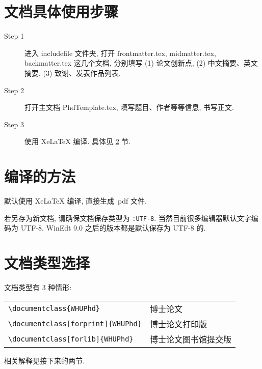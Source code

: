 \documentclass{WHUPhd}  %
\begin{document}
\section{文档具体使用步骤}

\begin{description}
  \item[Step 1]  进入 includefile 文件夹,  打开 frontmatter.tex,  midmatter.tex,  backmatter.tex 这几个文档,
        分别填写 (1) 论文创新点, (2) 中文摘要、英文摘要, (3) 致谢、发表作品列表.

  \item[Step 2]  打开主文档 PhdTemplate.tex, 填写题目、作者等等信息, 书写正文.

  \item[Step 3]  使用 XeLaTeX{} 编译. 具体见 \ref{sec-compile} 节.

\end{description}


\section{编译的方法}\label{sec-compile}

默认使用 XeLaTeX 编译, 直接生成~pdf 文件.

若另存为新文档, 请确保文档保存类型为 \verb|:UTF-8|. 当然目前很多编辑器默认文字编码为 UTF-8.
WinEdt 9.0 之后的版本都是默认保存为 UTF-8 的.




\section{文档类型选择}
文档类型有 3 种情形:

\begin{table}[ht]\centering
\begin{tabular}{ll}
\hline
   \verb|\documentclass{WHUPhd}|                   &  博士论文 \\
   \verb|\documentclass[forprint]{WHUPhd}|        &  博士论文打印版 \\
   \verb|\documentclass[forlib]{WHUPhd}|           &  博士论文图书馆提交版 \\
\hline
\end{tabular}
\end{table}
相关解释见接下来的两节.
\end{document}
